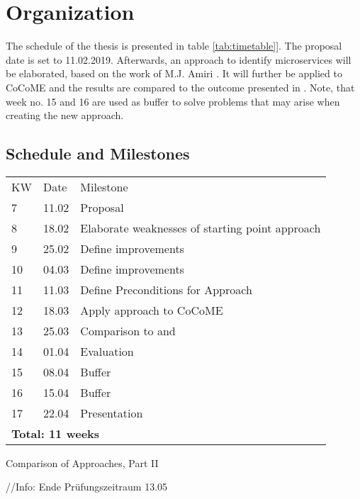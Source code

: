 \chapter{Organization}
\label{ch:timetable}
The schedule of the thesis is presented in table \ref{tab:timetable}]. The proposal date is set to 11.02.2019. Afterwards, an approach to identify microservices will be elaborated, based on the work of M.J. Amiri \cite{ObjectAwareAmiri}.  It will further be applied to CoCoME and the results are compared to the outcome presented in \cite{FunctionalDecompositionHeinrich}.
Note, that week no. 15 and 16 are used as buffer to solve problems that may arise when creating the new approach.

\section{Schedule and Milestones}
\label{sec:timetable:milestones}

	\begin{threeparttable}[h!]
	
	\centering
	
	
	\begin{tabularx}{\linewidth}{llX}
		\rowcolor{gray!50}
	     KW & Date & Milestone \\
	    7 & 11.02 &  Proposal \\
	     8& 18.02 &  Elaborate weaknesses of starting point approach \cite{ObjectAwareAmiri}\\
	     9&  25.02&  Define improvements \\
	     10&  04.03& Define improvements  \\
	     11&  11.03& Define Preconditions for Approach \\
	     12&  18.03& Apply approach to CoCoME \\
	     13&  25.03& Comparison to \cite{FunctionalDecompositionHeinrich} and  \\
	     14&  01.04& Evaluation  \\
	     15&  08.04& Buffer  \\
	     16&  15.04& Buffer  \\
	     17&  22.04& Presentation  \\
	     \multicolumn{3}{l}{\textbf{Total: 11 weeks}} 
		
	\end{tabularx}
	\caption{Comparison of Approaches, Part II}
	\label{tab:timetable}
	
	//Info: Ende Prüfungszeitraum 13.05
	
\end{threeparttable}
